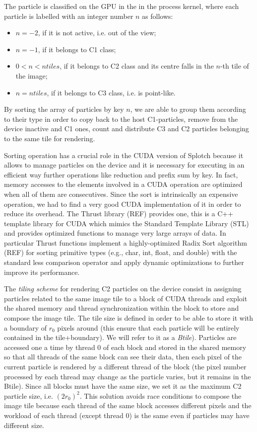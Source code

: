 \documentclass[11pt]{article}
\begin{document}
The particle is classified on the GPU in the in the process kernel, where each particle is labelled with an integer number $n$ as follows:
\begin{itemize}
\item 
$n = -2$, if it is not active, i.e. out of the view;
\item
$n = -1$, if it belongs to C1 class; 
\item
$0 < n < ntiles$, if it belongs to C2 class and its centre falls in the $n$-th tile of the image;  
\item
$n = ntiles$, if it belongs to C3 class, i.e. is point-like.
\end{itemize}
By sorting the array of particles by key $n$, we are able to group them according to their type in order to copy back to the host C1-particles, remove from the device inactive and C1 ones, count and distribute C3 and C2 particles belonging to the same tile for rendering. 

Sorting operation has a crucial role in the CUDA version of Splotch because it allows to manage particles on the device and it is necessary for executing in an efficient way further operations like reduction and prefix sum by key. In fact, memory accesses to the elements involved in a CUDA operation are optimized when all of them are consecutives. Since the sort is intrinsically an expensive operation, we had to find a very good CUDA implementation of it in order to reduce its overhead. 
The Thrust library (REF) provides one, this is a C++ template library for CUDA which mimics the Standard Template Library (STL) and provides optimized functions to manage very large arrays of data. In particular Thrust functions implement a highly-optimized Radix Sort algorithm (REF) for sorting primitive types (e.g., char, int, float, and double) with the standard less comparison operator and apply dynamic optimizations to further improve its performance.

The \textit{tiling scheme} for rendering C2 particles on the device consist in assigning particles related to the same image tile to a block of CUDA threads and exploit the shared memory and thread synchronization within the block to store and compose the image tile. The tile size is defined in order to be able to store it with a boundary of $r_0$ pixels around (this ensure that each particle will be entirely contained in the tile+boundary). We will refer to it as a \textit{Btile}). Particles are accessed one a time by thread 0 of each block and stored in the shared memory so that all threads of the same block can see their data, then each pixel of the current particle is rendered by a different thread of the block (the pixel number processed by each thread may change as the particle varies, but it remains in the Btile). Since all blocks must have the same size, we set it as the maximum C2 particle size, i.e. $(2r_0)^2$. 
This solution avoids race conditions to compose the image tile because each thread of the same block accesses different pixels and the workload of each thread (except thread 0) is the same even if particles may have different size.
\end{document}

